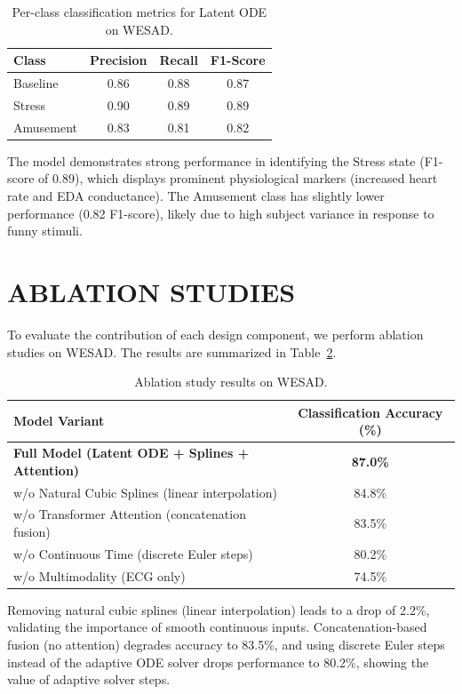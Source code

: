 \documentclass[12pt, a4paper]{report}
\numberwithin{equation}{chapter}
\begin{document}
\begin{table}[H]
\centering
\caption{Per-class classification metrics for Latent ODE on WESAD.}
\label{tab:per_class}
\begin{tabular}{lccc}
\toprule
\textbf{Class} & \textbf{Precision} & \textbf{Recall} & \textbf{F1-Score} \\
\midrule
Baseline & 0.86 & 0.88 & 0.87 \\
Stress & 0.90 & 0.89 & 0.89 \\
Amusement & 0.83 & 0.81 & 0.82 \\
\bottomrule
\end{tabular}
\end{table}

The model demonstrates strong performance in identifying the Stress state (F1-score of 0.89), which displays prominent physiological markers (increased heart rate and EDA conductance). The Amusement class has slightly lower performance (0.82 F1-score), likely due to high subject variance in response to funny stimuli.

\section{ABLATION STUDIES}
To evaluate the contribution of each design component, we perform ablation studies on WESAD. The results are summarized in Table~\ref{tab:ablation_results}.

\begin{table}[H]
\centering
\caption{Ablation study results on WESAD.}
\label{tab:ablation_results}
\begin{tabular}{lc}
\toprule
\textbf{Model Variant} & \textbf{Classification Accuracy (\%)} \\
\midrule
\textbf{Full Model (Latent ODE + Splines + Attention)} & \textbf{87.0\%} \\
w/o Natural Cubic Splines (linear interpolation) & 84.8\% \\
w/o Transformer Attention (concatenation fusion) & 83.5\% \\
w/o Continuous Time (discrete Euler steps) & 80.2\% \\
w/o Multimodality (ECG only) & 74.5\% \\
\bottomrule
\end{tabular}
\end{table}

Removing natural cubic splines (linear interpolation) leads to a drop of 2.2\%, validating the importance of smooth continuous inputs. Concatenation-based fusion (no attention) degrades accuracy to 83.5\%, and using discrete Euler steps instead of the adaptive ODE solver drops performance to 80.2\%, showing the value of adaptive solver steps.
\end{document}
